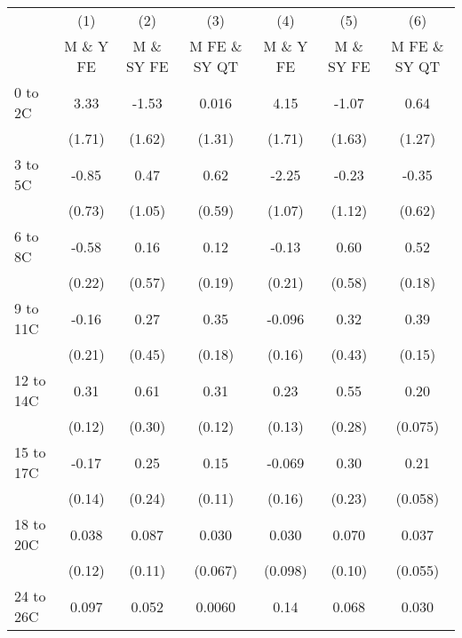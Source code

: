 \documentclass[paper=letterpaper, fontsize=11pt]{article} %
\begin{document}
\begin{longtable}{l*{6}{c}} \hline\hline\endfirsthead\hline\endhead\hline\endfoot\endlastfoot
                    &\multicolumn{1}{c}{(1)}&\multicolumn{1}{c}{(2)}&\multicolumn{1}{c}{(3)}&\multicolumn{1}{c}{(4)}&\multicolumn{1}{c}{(5)}&\multicolumn{1}{c}{(6)}\\
                    &\multicolumn{1}{c}{M \& Y FE}&\multicolumn{1}{c}{M \& SY FE}&\multicolumn{1}{c}{M FE \& SY QT}&\multicolumn{1}{c}{M \& Y FE}&\multicolumn{1}{c}{M \& SY FE}&\multicolumn{1}{c}{M FE \& SY QT}\\
\hline
0 to 2C             &        3.33&       -1.53&       0.016&        4.15&       -1.07&        0.64\\
                    &      (1.71)&      (1.62)&      (1.31)&      (1.71)&      (1.63)&      (1.27)\\
3 to 5C             &       -0.85&        0.47&        0.62&       -2.25&       -0.23&       -0.35\\
                    &      (0.73)&      (1.05)&      (0.59)&      (1.07)&      (1.12)&      (0.62)\\
6 to 8C             &       -0.58&        0.16&        0.12&       -0.13&        0.60&        0.52\\
                    &      (0.22)&      (0.57)&      (0.19)&      (0.21)&      (0.58)&      (0.18)\\
9 to 11C            &       -0.16&        0.27&        0.35&      -0.096&        0.32&        0.39\\
                    &      (0.21)&      (0.45)&      (0.18)&      (0.16)&      (0.43)&      (0.15)\\
12 to 14C           &        0.31&        0.61&        0.31&        0.23&        0.55&        0.20\\
                    &      (0.12)&      (0.30)&      (0.12)&      (0.13)&      (0.28)&     (0.075)\\
15 to 17C           &       -0.17&        0.25&        0.15&      -0.069&        0.30&        0.21\\
                    &      (0.14)&      (0.24)&      (0.11)&      (0.16)&      (0.23)&     (0.058)\\
18 to 20C           &       0.038&       0.087&       0.030&       0.030&       0.070&       0.037\\
                    &      (0.12)&      (0.11)&     (0.067)&     (0.098)&      (0.10)&     (0.055)\\
24 to 26C           &       0.097&       0.052&      0.0060&        0.14&       0.068&       0.030\\

\end{longtable}
\end{document}
